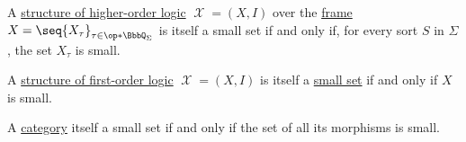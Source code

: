 \begin{proposition}
\begin{thmenum}
     A \hyperref[def:hol_structure]{structure of higher-order logic} \( \mscrX = (X, I) \) over the \hyperref[def:hol_frame]{frame} \( X = \seq{ X_\tau }_{\tau \in \op*{\BbbQ_\Sigma}} \) is itself a small set if and only if, for every sort \( S \) in \( \Sigma \), the set \( X_\tau \) is small.

     A \hyperref[def:fol_structure]{structure of first-order logic} \( \mscrX = (X, I) \) is itself a \hyperref[def:small_set]{small set} if and only if \( X \) is small.

     A \hyperref[def:category]{category} itself a small set if and only if the set of all its morphisms is small.
  \end{thmenum}
\end{proposition}

